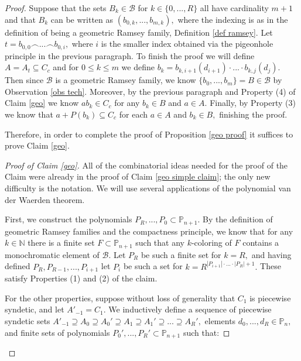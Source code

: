 \documentclass[10pt,a4paper]{article}
\theoremstyle{definition}
\begin{document}
\begin{proof}
Suppose that the sets $B_k\in\mathcal{B}$ for $k\in \{0,...,R\}$ all have cardinality $m+1$ and that $B_k$ can be written as $(b_{0,k},...,b_{m,k}),$ where the indexing is as in the definition of being a geometric Ramsey family, Definition \ref{def ramsey}.  Let $t=b_{0,0}\smallfrown...\smallfrown b_{0,i},$ where $i$ is the smaller index obtained via the pigeonhole principle in the previous paragraph.  To finish the proof we will define $A=A_t\subseteq C_c$ and for $0\leq k\leq m$ we define $b_k=b_{k,i+1}(d_{i+1})\cdot...\cdot b_{k,j}(d_j).$  Then since $\mathcal{B}$ is a geometric Ramsey family, we know $\{b_0,...,b_m\}=B\in \mathcal{B}$ by Observation \ref{obs tech}.  Moreover, by the previous paragraph and Property (4) of Claim \ref{geo} we know $ab_k\in C_c$ for any $b_k\in B$ and $a\in A.$  Finally, by Property (3) we know that $a+P(b_k)\subseteq C_c$ for each $a\in A$ and $b_k\in B,$ finishing the proof. 

\vspace{2mm}

Therefore, in order to complete the proof of Proposition \ref{geo proof} it suffices to prove Claim \ref{geo}.

\begin{proof}[Proof of Claim \ref{geo}]

All of the combinatorial ideas needed for the proof of the Claim were already in the proof of Claim \ref{geo simple claim}; the only new difficulty is the notation.   We will use several applications of the polynomial van der Waerden theorem.

First, we construct the polynomials $P_R,...,P_0\subset \mathbb{P}_{n+1}.$  By the definition of geometric Ramsey families and the compactness principle, we know that for any $k\in \mathbb{N}$ there is a finite set $F\subset \mathbb{P}_{n+1}$ such that any $k$-coloring of $F$ contains a monochromatic element of $\mathcal{B}.$  Let $P_R$ be such a finite set for $k=R,$ and having defined $P_R,P_{R-1},...,P_{i+1}$ let $P_i$ be such a set for $k=R^{|P_{i+1}|\cdot...\cdot|P_R|+1}.$  These satisfy Properties (1) and (2) of the claim.

For the other properties, suppose without loss of generality that $C_1$ is piecewise syndetic, and let $A'_{-1}=C_1.$  We inductively define a sequence of piecewise syndetic sets $A'_{-1}\supseteq A_0\supseteq A_0'\supseteq A_1\supseteq A_1'\supseteq... \supseteq A_{R}',$ elements $d_0,...,d_R\in \mathbb{P}_n,$ and finite sets of polynomials $P_0',...,P_R'\subset \mathbb{P}_{n+1}$ such that:


\end{proof}
\end{proof}
\end{document}
